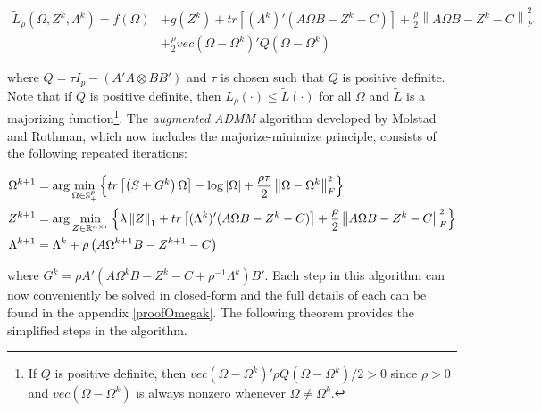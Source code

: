 \documentclass[11pt,]{report}
\theoremstyle{definition}
\theoremstyle{definition}
\theoremstyle{definition}
\theoremstyle{remark}
\begin{document}
\begin{equation}
\begin{split}
  \tilde{L}_{\rho}\left(\Omega, Z^{k}, \Lambda^{k}\right) = f\left(\Omega\right) &+ g\left(Z^{k}\right) + tr\left[(\Lambda^{k})'(A\Omega B - Z^{k} - C) \right] + \frac{\rho}{2}\left\|A\Omega B - Z^{k} - C \right\|_{F}^{2} \\
  &+ \frac{\rho}{2}vec\left(\Omega - \Omega^{k}\right)' Q\left(\Omega - \Omega^{k}\right)
\end{split}
\label{eq:approx}
\end{equation}

where \(Q = \tau I_{p} - \left(A'A \otimes BB'\right)\) and \(\tau\) is chosen such that \(Q\) is positive definite. Note that if \(Q\) is positive definite, then \(L_{\rho}\left(\cdot\right) \leq \tilde{L}\left(\cdot\right)\) for all \(\Omega\) and \(\tilde{L}\) is a majorizing function\footnote{If \(Q\) is positive definite, then \(vec\left(\Omega - \Omega^{k} \right)'\rho Q\left(\Omega - \Omega^{k} \right)/2 > 0\) since \(\rho > 0\) and \(vec\left(\Omega - \Omega^{k}\right)\) is always nonzero whenever \(\Omega \neq \Omega^{k}\).}. The \emph{augmented ADMM} algorithm developed by Molstad and Rothman, which now includes the majorize-minimize principle, consists of the following repeated iterations:

\begin{equation}
\begin{split}
  \Omega^{k + 1} &= \arg\min_{\Omega \in \mathbb{S}_{+}^{p}}\left\{tr\left[\left(S + G^{k}\right)\Omega\right] - \log\left|\Omega\right| + \frac{\rho\tau}{2}\left\|\Omega - \Omega^{k}\right\|_{F}^{2} \right\}\\
  Z^{k + 1} &= \arg\min_{Z \in \mathbb{R}^{n \times r}}\left\{\lambda\left\|Z\right\|_{1} + tr\left[(\Lambda^{k})'(A\Omega B - Z^{k} - C) \right] + \frac{\rho}{2}\left\|A\Omega B - Z^{k} - C \right\|_{F}^{2} \right\} \\
  \Lambda^{k + 1} &= \Lambda^{k} + \rho\left(A\Omega^{k + 1}B - Z^{k + 1} - C \right)
\end{split}
\label{eq:augADMM}\notag
\end{equation}

where \(G^{k} = \rho A'\left( A\Omega^{k} B - Z^{k} - C + \rho^{-1}\Lambda^{k} \right)B'\). Each step in this algorithm can now conveniently be solved in closed-form and the full details of each can be found in the appendix \ref{proofOmegak}. The following theorem provides the simplified steps in the algorithm.
\end{document}
